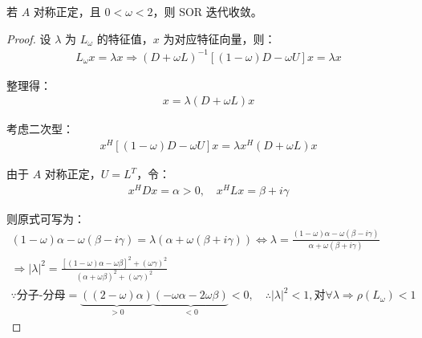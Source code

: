 \begin{theorem}
    \label{theorem_sor_convergence}
    若 $A$ 对称正定，且 $0 < \omega < 2$，则 SOR 迭代收敛。
\begin{proof}
设 $\lambda$ 为 $L_\omega$ 的特征值，$x$ 为对应特征向量，则：
\begin{gather*}
L_\omega x = \lambda x \Rightarrow (D + \omega L)^{-1}[(1 - \omega)D - \omega U]x = \lambda x
\end{gather*}

整理得：
\begin{gather*}
[(1 - \omega)D - \omega U]x = \lambda(D + \omega L)x
\end{gather*}

考虑二次型：
\begin{gather*}
x^H [(1 - \omega)D - \omega U]x = \lambda x^H (D + \omega L)x
\end{gather*}

由于 $A$ 对称正定，$U = L^T$，令：
\begin{gather*}
x^H Dx = \alpha> 0,\quad x^H Lx=\beta+i\gamma
\end{gather*}

则原式可写为：
\begin{gather*}
(1 - \omega)\alpha - \omega (\beta-i\gamma )= \lambda(\alpha + \omega (\beta+i\gamma))
\Leftrightarrow
\lambda = \frac{(1 - \omega)\alpha - \omega(\beta-i\gamma)}{\alpha + \omega (\beta+i\gamma)}\\
\Rightarrow |\lambda|^2=\frac{[(1 - \omega)\alpha - \omega \beta]^2 + (\omega \gamma)^2}{(\alpha + \omega \beta)^2 + (\omega \gamma)^2}\\
\because \text{分子-分母}=\underbrace{((2-\omega)\alpha)}_{>0}\underbrace{(-\omega \alpha-2\omega \beta)}_{<0} <0,\quad
\therefore |\lambda|^2 <1,\text{对}\forall \lambda \Rightarrow \rho(L_\omega) <1
\end{gather*}
\end{proof}
\end{theorem}

